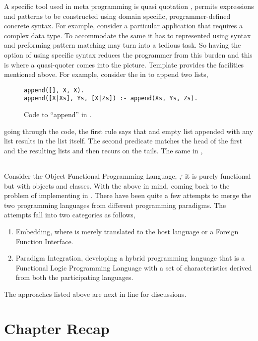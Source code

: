 \documentclass[thesis-solanki.tex]{subfiles}
\begin{document}
A specific tool used in meta programming is quasi quotation \cite{mainland2007s,haskellquasi,wikiquasi},
permits
 expressions and patterns to be constructed using domain specific, programmer-defined concrete
syntax.
For example, consider a particular application that requires a complex data type.
To accommodate the same it has to represented using  syntax and preforming pattern matching may
turn into a tedious task.
So having the option of using specific syntax reduces the programmer from this burden and this is where a
quasi-quoter comes into the picture.
Template  provides the facilities mentioned above.
For example, consider the 
in  to append two lists,
\begin{figure}[h]
\begin{verbatim}
append([], X, X).
append([X|Xs], Ys, [X|Zs]) :- append(Xs, Ys, Zs).
\end{verbatim}    
\vspace*{-0.8\baselineskip}
\caption{Code to ``append'' in \protect{}.}
\label{fig:append-prolog}
\end{figure}
going through the code, the first rule says that and empty list appended with any list results in the list itself.
The second predicate matches the head of the first and the resulting lists and then recurs on the tails.
The same in ,
\inputminted[linenos]{haskell}{append.pl}

Consider the Object Functional Programming Language,  \cite{website:scala},\textsuperscript{,}
it is purely functional but with objects and classes.
With the above in mind, coming back to the problem of implementing  in .
There have been quite a few attempts to merge the two programming languages from different programming paradigms.
The attempts fall into two categories as follows,

\begin{enumerate}
\item
  Embedding, where  is merely translated to the host language  or a Foreign
  Function Interface.

\item
  Paradigm Integration, developing a hybrid programming language that is a Functional Logic Programming Language
  with a set of characteristics derived from both the participating languages.
\end{enumerate}

The approaches listed above are next in line for discussions.  


\section{Chapter Recap}
\end{document}
